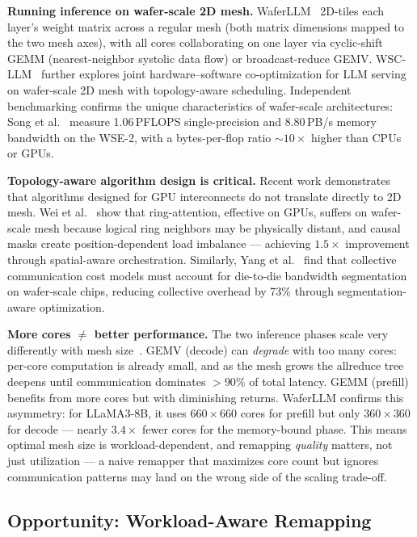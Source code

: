 \documentclass[sigplan,anonymous,review,nonacm]{acmart}
\begin{document}
\textbf{Running inference on wafer-scale 2D mesh.}
WaferLLM~\cite{he2025waferllm} 2D-tiles each layer's weight matrix across a regular mesh (both matrix dimensions mapped to the two mesh axes), with all cores collaborating on one layer via cyclic-shift GEMM (nearest-neighbor systolic data flow) or broadcast-reduce GEMV. WSC-LLM~\cite{xu2025wscllm} further explores joint hardware--software co-optimization for LLM serving on wafer-scale 2D mesh with topology-aware scheduling.
Independent benchmarking confirms the unique characteristics of wafer-scale architectures: Song et al.~\cite{song2025benchmarkwse} measure 1.06\,PFLOPS single-precision and 8.80\,PB/s memory bandwidth on the WSE-2, with a bytes-per-flop ratio ${\sim}10\times$ higher than CPUs or GPUs.

\textbf{Topology-aware algorithm design is critical.}
Recent work demonstrates that algorithms designed for GPU interconnects do not translate directly to 2D mesh. Wei et al.~\cite{wei2025spatialattention} show that ring-attention, effective on GPUs, suffers on wafer-scale mesh because logical ring neighbors may be physically distant, and causal masks create position-dependent load imbalance --- achieving $1.5\times$ improvement through spatial-aware orchestration. Similarly, Yang et al.~\cite{yang2025segmentation} find that collective communication cost models must account for die-to-die bandwidth segmentation on wafer-scale chips, reducing collective overhead by 73\% through segmentation-aware optimization.

\textbf{More cores $\neq$ better performance.}
The two inference phases scale very differently with mesh size~\cite{he2025waferllm}. GEMV (decode) can \emph{degrade} with too many cores: per-core computation is already small, and as the mesh grows the allreduce tree deepens until communication dominates ${>}90\%$ of total latency. GEMM (prefill) benefits from more cores but with diminishing returns.
WaferLLM confirms this asymmetry: for LLaMA3-8B, it uses $660 \times 660$ cores for prefill but only $360 \times 360$ for decode --- nearly $3.4\times$ fewer cores for the memory-bound phase. This means optimal mesh size is workload-dependent, and remapping \emph{quality} matters, not just utilization --- a naive remapper that maximizes core count but ignores communication patterns may land on the wrong side of the scaling trade-off.

\subsection{Opportunity: Workload-Aware Remapping}
\label{sec:bg-opportunity}
\end{document}
